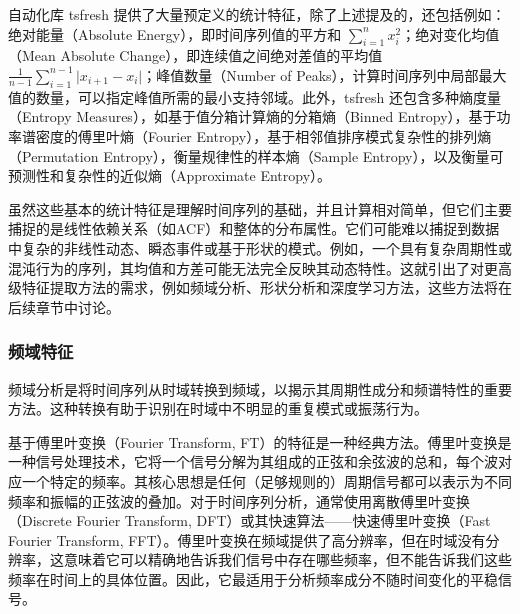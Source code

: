 自动化库 tsfresh 提供了大量预定义的统计特征，除了上述提及的，还包括例如：绝对能量（Absolute Energy），即时间序列值的平方和 $\sum_{i=1}^{n} x_i^2$；绝对变化均值（Mean Absolute Change），即连续值之间绝对差值的平均值 $\frac{1}{n-1}\sum_{i=1}^{n-1} \lvert x_{i+1} - x_i \rvert$；峰值数量（Number of Peaks），计算时间序列中局部最大值的数量，可以指定峰值所需的最小支持邻域。此外，tsfresh 还包含多种熵度量（Entropy Measures），如基于值分箱计算熵的分箱熵（Binned Entropy），基于功率谱密度的傅里叶熵（Fourier Entropy），基于相邻值排序模式复杂性的排列熵（Permutation Entropy），衡量规律性的样本熵（Sample Entropy），以及衡量可预测性和复杂性的近似熵（Approximate Entropy）。

虽然这些基本的统计特征是理解时间序列的基础，并且计算相对简单，但它们主要捕捉的是线性依赖关系（如ACF）和整体的分布属性。它们可能难以捕捉到数据中复杂的非线性动态、瞬态事件或基于形状的模式。例如，一个具有复杂周期性或混沌行为的序列，其均值和方差可能无法完全反映其动态特性。这就引出了对更高级特征提取方法的需求，例如频域分析、形状分析和深度学习方法，这些方法将在后续章节中讨论。

        \subsubsection{频域特征}
            \label{sec:ts_statistical_spectral}
频域分析是将时间序列从时域转换到频域，以揭示其周期性成分和频谱特性的重要方法。这种转换有助于识别在时域中不明显的重复模式或振荡行为。

基于傅里叶变换（Fourier Transform, FT）的特征是一种经典方法。傅里叶变换是一种信号处理技术，它将一个信号分解为其组成的正弦和余弦波的总和，每个波对应一个特定的频率。其核心思想是任何（足够规则的）周期信号都可以表示为不同频率和振幅的正弦波的叠加。对于时间序列分析，通常使用离散傅里叶变换（Discrete Fourier Transform, DFT）或其快速算法——快速傅里叶变换（Fast Fourier Transform, FFT）。傅里叶变换在频域提供了高分辨率，但在时域没有分辨率，这意味着它可以精确地告诉我们信号中存在哪些频率，但不能告诉我们这些频率在时间上的具体位置。因此，它最适用于分析频率成分不随时间变化的平稳信号。

